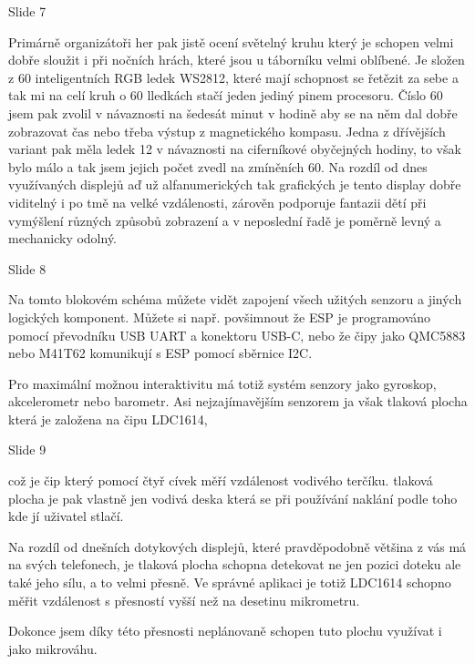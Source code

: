 Slide 7

Primárně organizátoři her pak jistě ocení světelný kruhu který je schopen velmi dobře sloužit i při nočních hrách,
které jsou u táborníku velmi oblíbené.
Je složen z 60 inteligentních RGB ledek WS2812, které mají schopnost se řetězit za sebe a tak mi na celí kruh o 60 lledkách
stačí jeden jediný pinem procesoru. %
Číslo 60 jsem pak zvolil v návaznosti na šedesát 
minut v hodině aby se na něm dal dobře zobrazovat čas nebo třeba výstup z magnetického kompasu. 
Jedna z dřívějších variant pak měla ledek 12 v návaznosti na ciferníkové obyčejných hodiny,
to však bylo málo a tak jsem jejich počet zvedl na zmíněních 60.
Na rozdíl od dnes využívaných displejů aď už alfanumerických tak grafických je tento display dobře viditelný i po tmě na velké vzdálenosti, 
zárověn podporuje fantazii dětí při vymýšlení různých způsobů zobrazení a v neposlední řadě je poměrně levný a mechanicky odolný. 


Slide 8

Na tomto blokovém schéma můžete vidět zapojení všech užitých senzoru a jiných logických komponent.
Můžete si např. povšimnout že ESP je programováno pomocí převodníku USB UART a konektoru USB-C,
nebo že čipy jako QMC5883 nebo M41T62 komunikují s ESP pomocí sběrnice I2C.

Pro maximální možnou interaktivitu má totiž systém senzory jako gyroskop, akcelerometr nebo barometr. 
Asi nejzajímavějším senzorem ja však tlaková plocha která je založena na čipu LDC1614, 


Slide 9

což je čip který 
pomocí čtyř cívek měří vzdálenost vodivého terčíku. tlaková plocha je pak vlastně 
jen vodivá deska která se při používání naklání podle toho kde jí uživatel stlačí. 

Na rozdíl od dnešních dotykových displejů,
které pravděpodobně většina z vás má na svých telefonech, je tlaková plocha schopna detekovat ne jen pozici doteku ale také jeho sílu,
a to velmi přesně. Ve správné aplikaci je totiž LDC1614 schopno měřit vzdálenost s přesností vyšší než na desetinu mikrometru.

Dokonce jsem díky této přesnosti neplánovaně schopen tuto plochu využívat i jako mikrováhu. %

